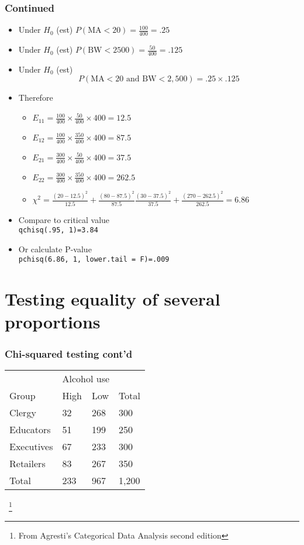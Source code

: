 \documentclass[aspectratio=169]{beamer}
\begin{document}
\begin{frame}\frametitle{Continued}
\begin{itemize}
\item Under $H_0$ (est) $P\left(\mbox{MA}<20\right) = \frac{100}{400} = .25$
\item Under $H_0$ (est) $P\left(\mbox{BW}<2500\right) = \frac{50}{400} = .125$
\item Under $H_0$ (est) 
  $$P\left(\mbox{MA}<20\mbox{ and BW}<2,500 \right) = .25 \times .125$$
\item Therefore
  \begin{itemize}
  \item $E_{11} = \frac{100}{400}\times\frac{50}{400}\times 400 = 12.5$
  \item $E_{12} = \frac{100}{400}\times\frac{350}{400}\times 400 = 87.5$
  \item $E_{21} = \frac{300}{400}\times\frac{50}{400}\times 400 = 37.5$
  \item $E_{22} = \frac{300}{400}\times\frac{350}{400}\times 400 = 262.5$
  \item $\chi^2 = \frac{(20 - 12.5)^2}{12.5} + \frac{(80- 87.5)^2}{87.5}
                  \frac{(30 - 37.5)^2}{37.5} + \frac{(270- 262.5)^2}{262.5}= 6.86$
  \end{itemize}
\item Compare to critical value \\
 \texttt{qchisq(.95, 1)=3.84}
\item Or calculate P-value \\ 
  \texttt{pchisq(6.86, 1, lower.tail = F)=.009}
\end{itemize}
\end{frame}

\section{Testing equality of several proportions}
\begin{frame}\frametitle{Chi-squared testing cont'd}
\ttfamily
\begin{center}
\begin{tabular}{llll}
& \multicolumn{2}{c}{Alcohol use} & \\
Group      & High & Low & Total \\ \hline
Clergy     & 32   & 268 & 300 \\
Educators  & 51   & 199 & 250 \\
Executives & 67   & 233 & 300 \\
Retailers  & 83   & 267 & 350 \\ \hline
Total      & 233  & 967 & 1,200
\end{tabular}
\end{center}
\normalfont
~\footnote{From Agresti's Categorical Data Analysis second edition}
\end{frame}
\end{document}
